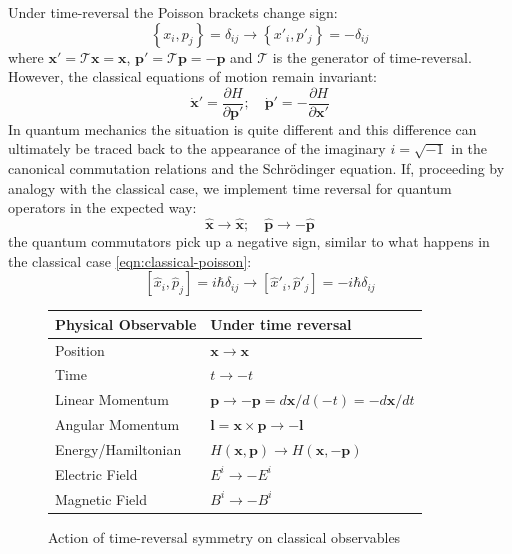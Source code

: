 \documentclass[preprint]{SciPost}
\newcommand{\mc}[1]{\mathcal{#1}}
\newcommand{\vect}[1]{\boldsymbol{#1}}
\theoremstyle{plain} %
\begin{document}
Under time-reversal the Poisson brackets change sign:
\begin{equation}\label{eqn:classical-poisson}
\left\{ x_i, p_j \right\} = \delta_{ij} \rightarrow \left\{ x'_i, p'_j \right\} = -\delta_{ij}
\end{equation}
where $ \vect{x'} = \mc{T} \vect{x} = \vect{x} $, $ \vect{p'} = \mc{T} \vect{p} = - \vect{p} $ and $ \mc{T} $ is the generator of time-reversal. However, the classical equations of motion remain invariant:
\begin{equation}\label{eqn:classical-eom}
\vect{\dot{x}'} = \frac{\partial H}{\partial \vect{p'}}; \quad \vect{\dot{p}'} = - \frac{\partial H}{\partial \vect{x'}}
\end{equation}
In quantum mechanics the situation is quite different and this difference can ultimately be traced back to the appearance of the imaginary $ i = \sqrt{-1} $ in the canonical commutation relations and the Schr\"{o}dinger equation. If, proceeding by analogy with the classical case, we implement time reversal for quantum operators in the expected way:
\begin{equation}\label{eqn:trs-quantum}
\vect{\hat{x}} \rightarrow \vect{\hat{x}}; \quad \vect{\hat{p}} \rightarrow -\vect{\hat{p}}
\end{equation}
the quantum commutators pick up a negative sign, similar to what happens in the classical case \eqref{eqn:classical-poisson}:
\begin{equation}\label{eqn:quantum-poisson}
\left[ \hat{x}_i, \hat{p}_j \right] = i \hbar \delta_{ij} \rightarrow \left[\hat{x}'_i, \hat{p}'_j \right] = - i \hbar \delta_{ij}
\end{equation}

\begin{figure}[htbp]
	\centering
	\begin{tabular}{|p{5cm}|p{6cm}|}
		\toprule
		Physical Observable & Under time reversal \\
		\midrule
		Position & \( \vect{x} \rightarrow \vect{x}\) \\
		Time & \( t \rightarrow -t\) \\
		Linear Momentum & \(\vect{p} \rightarrow -\vect{p} = d\vect{x}/d(-t) = - d\vect{x}/dt\) \\
		Angular Momentum & \( \vect{l} = \vect{x} \times \vect{p} \rightarrow -\vect{l} \)  \\
		Energy/Hamiltonian & \( H(\vect{x},\vect{p}) \rightarrow H(\vect{x}, -\vect{p}) \)  \\
		Electric Field & \( E^i \rightarrow -E^i\) \\
		Magnetic Field & \( B^i \rightarrow - B^i \) \\
		\bottomrule
	\end{tabular}
	\caption{Action of time-reversal symmetry on classical observables}
	\label{tbl:trs-classical}
\end{figure}
\end{document}
